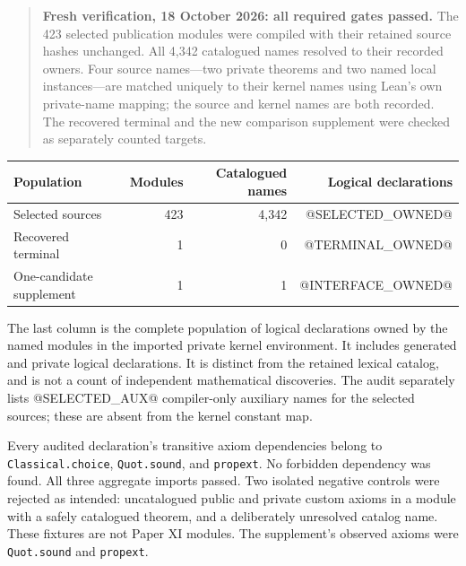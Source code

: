 \begin{quote}
\textbf{Fresh verification, 18 October 2026: all required gates passed.}
The 423 selected publication modules were compiled with their retained source
hashes unchanged. All 4,342 catalogued names resolved to their recorded owners.
Four source names---two private theorems and two named local instances---are
matched uniquely to their kernel names using Lean's own private-name mapping;
the source and kernel names are both recorded.
The recovered terminal and the new comparison supplement were checked as
separately counted targets.
\end{quote}

\begin{center}\small
\begin{tabular}{@{}lrrr@{}}
\toprule
Population & Modules & Catalogued names & Logical declarations\\
\midrule
Selected sources & 423 & 4,342 & @SELECTED_OWNED@\\
Recovered terminal & 1 & 0 & @TERMINAL_OWNED@\\
One-candidate supplement & 1 & 1 & @INTERFACE_OWNED@\\
\bottomrule
\end{tabular}
\end{center}

The last column is the complete population of logical declarations owned by
the named modules in the imported private kernel environment. It includes
generated and private logical declarations. It is distinct from the retained
lexical catalog, and is not a count of independent mathematical discoveries.
The audit separately lists @SELECTED_AUX@ compiler-only auxiliary names for
the selected sources; these are absent from the kernel constant map.

Every audited declaration's transitive axiom dependencies belong to
\texttt{Classical.choice}, \texttt{Quot.sound}, and \texttt{propext}.
No forbidden dependency was found. All three aggregate imports passed.
Two isolated negative controls were rejected as intended: uncatalogued public
and private custom axioms in a module with a safely catalogued theorem, and a
deliberately unresolved catalog name. These fixtures are not Paper XI modules.
The supplement's observed axioms were \texttt{Quot.sound} and \texttt{propext}.

